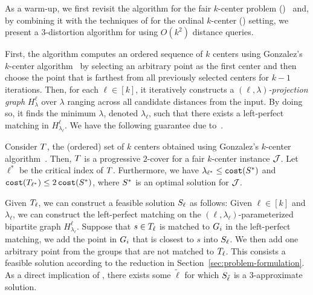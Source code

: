 

As a warm-up, we first revisit the algorithm for the fair $k$-center problem (\fairkcenter)~\cite{gadekar2025fair} and, by combining it with the techniques of \citet{burkhardt2024low} for the ordinal $k$-center (\ordkcen) setting, we present a 3-distortion algorithm for \ordfairkcen using $O(k^2)$ distance queries.

First, the algorithm computes an ordered sequence \InitSolSet of $k$ centers using Gonzalez's $k$-center algorithm~\cite{gonzalez1985clustering}
by selecting an arbitrary point as the first center and then choose the point that is farthest from all previously selected centers for $k-1$ iterations.
Then, for each $\ell \in [k]$, it iteratively constructs a \emph{$(\ell, \lambda)$-projection graph} $H^{\ell}_{\lambda}$ over $\lambda$ ranging across all candidate distances from the input.
By doing so, it finds the minimum $\lambda$, denoted $\lambda_{\ell}$, such that there exists a left-perfect matching in $H^{\ell}_{\lambda_{\ell}}$.
We have the following guarantee due to~\citet{gadekar2025fair}.


\begin{theorem}
 \label{corollary:lambda-ell-star-lower-bound}
    Consider $T$, the (ordered) set of $k$ centers obtained using Gonzalez's $k$-center algorithm~\cite{gonzalez1985clustering}.
    Then, $T$ is a progressive $2$-cover for a fair $k$-center instance $\mathcal{J}$. 
    Let $\ell^*$ be the critical index of $T$.
    Furthermore, we have $\lambda_{\ell^*} \leq \texttt{cost}(S^*)$ and $\texttt{cost}(T_{\ell^*}) \leq 2\, \texttt{cost}(S^*)$, where $S^*$ is an optimal solution for $\mathcal{J}$. 
\end{theorem}



Given $T_{\ell}$, we can construct a feasible solution $S_{\ell}$ as follows:
Given $\ell \in [k]$ and $\lambda_{\ell}$, we can construct the left-perfect matching on the $(\ell, \lambda_{\ell})$-parameterized bipartite graph $H^{\ell}_{\lambda_{\ell}}$.
Suppose that $s \in T_{\ell}$ is matched to $G_i$ in the left-perfect matching, we add the point in $G_i$ that is closest to $s$ into $S_{\ell}$. 
We then add one arbitrary point from the groups that are not matched to $T_{\ell}$.
This consists a feasible solution 
according to the reduction in Section~\ref{sec:problem-formulation}.
As a direct implication of , there exists some $\tilde{\ell}$ for which $S_{\tilde{\ell}}$ is a $3$-approximate solution.

